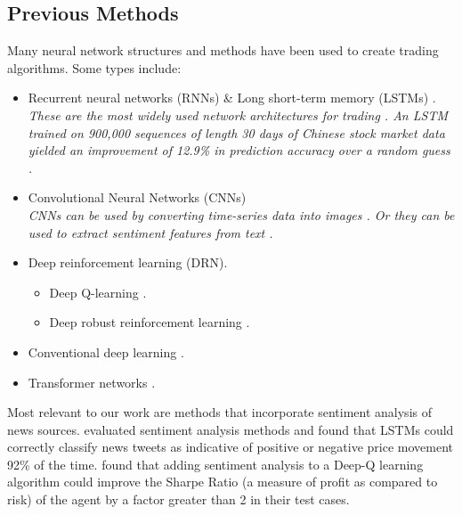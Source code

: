 \documentclass[conference]{IEEEtran}
\begin{document}
\subsection{Previous Methods}
Many neural network structures and methods have been used to create trading algorithms. Some types include: 
\begin{itemize}
	\item Recurrent neural networks (RNNs) \& Long short-term memory (LSTMs) \cite{Chen2017}\cite{Mehta2021}.
	      \\\emph{These are the most widely used network architectures for trading \cite{Gu2020}. An LSTM trained on 900,000 sequences of length 30 days of Chinese stock market data yielded an improvement of 12.9\% in prediction accuracy over a random guess \cite{Chen2015}.}
	\item Convolutional Neural Networks (CNNs) \cite{Gu2020}
	      \\\emph{CNNs can be used by converting time-series data into images \cite{Sezer2018}. Or they can be used to extract sentiment features from text \cite{Shi2020}.}
	\item Deep reinforcement learning (DRN).
	      \begin{itemize}
	      	\item Deep Q-learning \cite{Wang2017} \cite{Nan2020}.
	      	\item Deep robust reinforcement learning \cite{Li2019}.
	      \end{itemize}
	\item Conventional deep learning \cite{Day2016}.
	\item Transformer networks \cite{Schmitz2020}.
\end{itemize}

Most relevant to our work are methods that incorporate sentiment analysis of news sources. \cite{Mehta2021} evaluated sentiment analysis methods and found that LSTMs could correctly classify news tweets as indicative of positive or negative price movement 92\% of the time. \cite{Nan2020} found that adding sentiment analysis to a Deep-Q learning algorithm could improve the Sharpe Ratio (a measure of profit as compared to risk) of the agent by a factor greater than 2 in their test cases.
\end{document}
